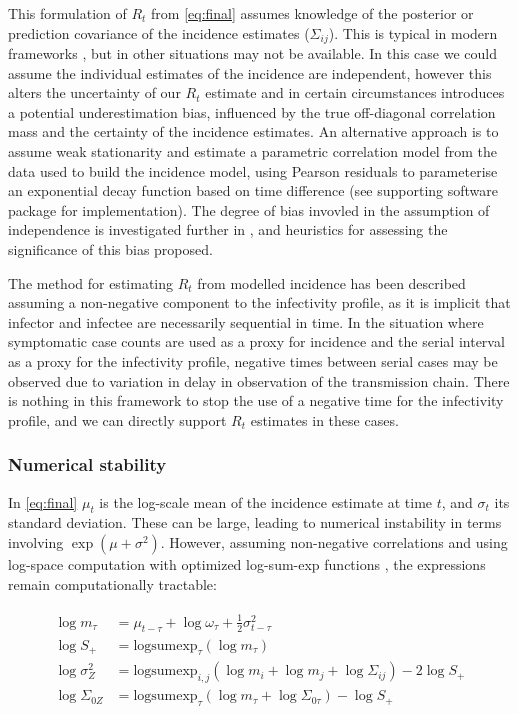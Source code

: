 \documentclass[10pt,letterpaper]{article}
\begin{document}
This formulation of $R_t$ from \eqref{eq:final} assumes knowledge of the posterior or prediction covariance of the incidence estimates ($\Sigma_{ij}$). This is typical in modern frameworks \cite{hastie2017,rue2009}, but in other situations may not be available. In this case we could assume the individual estimates of the incidence are independent, however this alters the uncertainty of our $R_t$ estimate and in certain circumstances introduces a potential underestimation bias, influenced by the true off-diagonal correlation mass and the certainty of the incidence estimates. An alternative approach is to assume weak stationarity and estimate a parametric correlation model from the data used to build the incidence model, using Pearson residuals to parameterise an exponential decay function based on time difference \cite{wood2017} (see supporting software package for implementation). The degree of bias invovled in the assumption of independence is investigated further in , and heuristics for assessing the significance of this bias proposed.

The method for estimating $R_t$ from modelled incidence has been described assuming a non-negative component to the infectivity profile, as it is implicit that infector and infectee are necessarily sequential in time. In the situation where symptomatic case counts are used as a proxy for incidence and the serial interval as a proxy for the infectivity profile, negative times between serial cases may be observed due to variation in delay in observation of the transmission chain. There is nothing in this framework to stop the use of a negative time for the infectivity profile, and we can directly support $R_t$ estimates in these cases.

\subsubsection*{Numerical stability}

In \eqref{eq:final} $\mu_t$ is the log-scale mean of the incidence estimate at time $t$, and $\sigma_t$ its standard deviation. These can be large, leading to numerical instability in terms involving $\exp(\mu + \sigma^2)$. However, assuming non-negative correlations and using log-space computation with optimized log-sum-exp functions \cite{blanchard2021}, the expressions remain computationally tractable:

\begin{eqnarray}
\begin{aligned}
\log m_\tau &= \mu_{t-\tau} + \log \omega_\tau + \frac{1}{2} \sigma_{t-\tau}^2 \\
\log S_+ &= \text{logsumexp}_\tau(\log m_\tau) \\
\log \sigma_Z^2 &= \text{logsumexp}_{i,j} \left( \log m_i + \log m_j + \log \Sigma_{ij} \right) - 2 \log S_+ \\
\log \Sigma_{0Z} &= \text{logsumexp}_\tau \left( \log m_\tau + \log \Sigma_{0\tau} \right) - \log S_+
\end{aligned}
\label{eq:logsumexp}
\end{eqnarray}
\end{document}
